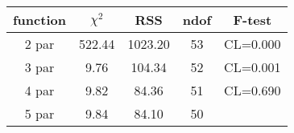 \begin{tabular}{c|c|c|c|c}
function & $\chi^2$ & RSS & ndof & F-test \\
\hline
2 par & 522.44 & 1023.20 & 53 & CL=0.000 \\
3 par & 9.76 & 104.34 & 52 & CL=0.001 \\
4 par & 9.82 & 84.36 & 51 & CL=0.690 \\
5 par & 9.84 & 84.10 & 50 & \\
\hline
\end{tabular}